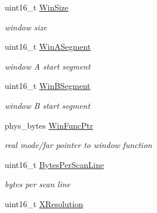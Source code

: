 \begin{DoxyCompactItemize}
\hypertarget{struct____attribute_____a78985f1c5ae166cb560099273cc558b4}{}\label{struct____attribute_____a78985f1c5ae166cb560099273cc558b4} 
uint16\+\_\+t \hyperlink{struct____attribute_____a78985f1c5ae166cb560099273cc558b4}{Win\+Size}
\begin{DoxyCompactList}\small\item\em window size \end{DoxyCompactList}\item 
\hypertarget{struct____attribute_____a99b747099fd4d4271b0f0bc29f31c48f}{}\label{struct____attribute_____a99b747099fd4d4271b0f0bc29f31c48f} 
uint16\+\_\+t \hyperlink{struct____attribute_____a99b747099fd4d4271b0f0bc29f31c48f}{Win\+A\+Segment}
\begin{DoxyCompactList}\small\item\em window A start segment \end{DoxyCompactList}\item 
\hypertarget{struct____attribute_____a9edf422a931df7c7a1d5f82afb911566}{}\label{struct____attribute_____a9edf422a931df7c7a1d5f82afb911566} 
uint16\+\_\+t \hyperlink{struct____attribute_____a9edf422a931df7c7a1d5f82afb911566}{Win\+B\+Segment}
\begin{DoxyCompactList}\small\item\em window B start segment \end{DoxyCompactList}\item 
\hypertarget{struct____attribute_____affd250a4766543099f253e27af3abc35}{}\label{struct____attribute_____affd250a4766543099f253e27af3abc35} 
phys\+\_\+bytes \hyperlink{struct____attribute_____affd250a4766543099f253e27af3abc35}{Win\+Func\+Ptr}
\begin{DoxyCompactList}\small\item\em real mode/far pointer to window function \end{DoxyCompactList}\item 
\hypertarget{struct____attribute_____afe40654a51bf4a12a8b376ff3506688e}{}\label{struct____attribute_____afe40654a51bf4a12a8b376ff3506688e} 
uint16\+\_\+t \hyperlink{struct____attribute_____afe40654a51bf4a12a8b376ff3506688e}{Bytes\+Per\+Scan\+Line}
\begin{DoxyCompactList}\small\item\em bytes per scan line \end{DoxyCompactList}\item 
\hypertarget{struct____attribute_____a16f6408e5a85c7a7785a0cee64b6a219}{}\label{struct____attribute_____a16f6408e5a85c7a7785a0cee64b6a219} 
uint16\+\_\+t \hyperlink{struct____attribute_____a16f6408e5a85c7a7785a0cee64b6a219}{X\+Resolution}

\end{DoxyCompactItemize}
